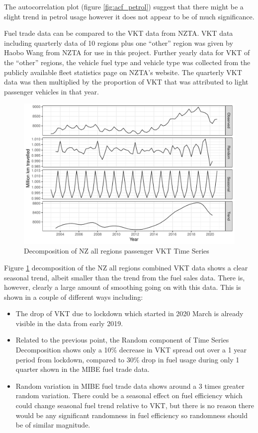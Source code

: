 \documentclass[
]{article}
\begin{document}
The autocorrelation plot (figure \ref{fig:acf_petrol}) suggest that
there might be a slight trend in petrol usage however it does not appear
to be of much significance.

Fuel trade data can be compared to the VKT data from NZTA. VKT data
including quarterly data of 10 regions plus one ``other'' region was
given by Haobo Wang from NZTA for use in this project. Further yearly
data for VKT of the ``other'' regions, the vehicle fuel type and vehicle
type was collected from the publicly available fleet statistics page on
NZTA's website. The quarterly VKT data was then multiplied by the
proportion of VKT that was attributed to light passenger vehicles in
that year.

\begin{figure}
\centering
\includegraphics{final_report_files/figure-latex/VKT_ts-1.pdf}
\caption{Decomposition of NZ all regions passenger VKT Time
Series\label{fig:VKT_ts}}
\end{figure}

Figure \ref{fig:VKT_ts} decomposition of the NZ all regions combined VKT
data shows a clear seasonal trend, albeit smaller than the trend from
the fuel sales data. There is, however, clearly a large amount of
smoothing going on with this data. This is shown in a couple of
different ways including:

\begin{itemize}
\item The drop of VKT due to lockdown which started in 2020 March is already visible in the data from early 2019. 
\item Related to the previous point, the Random component of Time Series Decomposition shows only a 10\% decrease in VKT spread out over a 1 year period from lockdown, compared to 30\% drop in fuel usage during only 1 quarter shown in the MIBE fuel trade data. 
\item Random variation in MIBE fuel trade data shows around a 3 times greater random variation. There could be a seasonal effect on fuel efficiency which could change seasonal fuel trend relative to VKT, but there is no reason there would be any significant randomness in fuel efficiency so randomness should be of similar magnitude.
\end{itemize}
\end{document}
